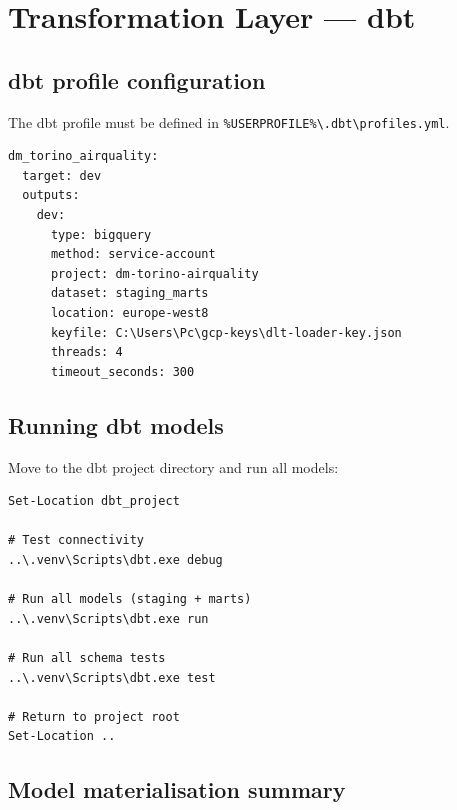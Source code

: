 \documentclass[11pt,a4paper]{article}
\begin{document}
\section{Transformation Layer — dbt}
\label{sec:dbt}

\subsection{dbt profile configuration}

The dbt profile must be defined in \texttt{\%USERPROFILE\%\textbackslash .dbt\textbackslash profiles.yml}.

\begin{lstlisting}[style=shell,language={}]
dm_torino_airquality:
  target: dev
  outputs:
    dev:
      type: bigquery
      method: service-account
      project: dm-torino-airquality
      dataset: staging_marts
      location: europe-west8
      keyfile: C:\Users\Pc\gcp-keys\dlt-loader-key.json
      threads: 4
      timeout_seconds: 300
\end{lstlisting}

\subsection{Running dbt models}

Move to the dbt project directory and run all models:

\begin{lstlisting}[style=shell]
Set-Location dbt_project

# Test connectivity
..\.venv\Scripts\dbt.exe debug

# Run all models (staging + marts)
..\.venv\Scripts\dbt.exe run

# Run all schema tests
..\.venv\Scripts\dbt.exe test

# Return to project root
Set-Location ..
\end{lstlisting}

\subsection{Model materialisation summary}
\end{document}
